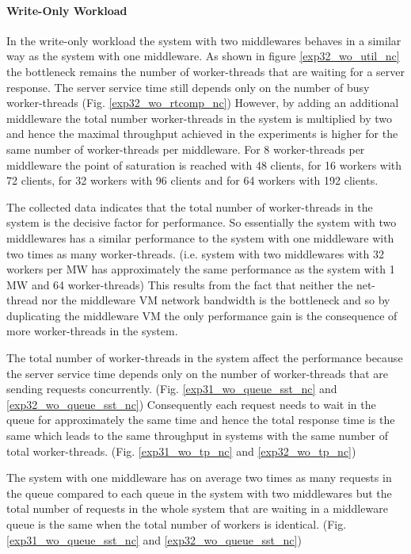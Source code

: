 \documentclass[report.tex]{subfiles}
\begin{document}
\paragraph{Write-Only Workload}

In the write-only workload the system with two middlewares behaves in a similar way as the system with one middleware. 
As shown in figure \ref{exp32_wo_util_nc} the bottleneck remains the number of worker-threads that are waiting for a server response. The server service time still depends only on the number of busy worker-threads (Fig. \ref{exp32_wo_rtcomp_nc})
However, by adding an additional middleware the total number worker-threads in the system is multiplied by two and hence the maximal throughput achieved in the experiments is higher for the same number of worker-threads per middleware.
For 8 worker-threads per middleware the point of saturation is reached with 48 clients, for 16 workers with 72 clients, for 32 workers with 96 clients and for 64 workers with 192 clients.


The collected data indicates that the total number of worker-threads in the system is the decisive factor for performance.
So essentially the system with two middlewares has a similar performance to the system with one middleware with two times as many worker-threads. (i.e. system with two middlewares with 32 workers per MW has approximately the same performance as the system with 1 MW and 64 worker-threads)
This results from the fact that neither the net-thread nor the middleware VM network bandwidth is the bottleneck and so by duplicating the middleware VM the only performance gain is the consequence of more worker-threads in the system.


The total number of worker-threads in the system affect the performance because the server service time depends only on the number of worker-threads that are sending requests concurrently. (Fig. \ref{exp31_wo_queue_sst_nc} and \ref{exp32_wo_queue_sst_nc})
Consequently each request needs to wait in the queue for approximately the same time and hence the total response time is the same which leads to the same throughput in systems with the same number of total worker-threads. (Fig. \ref{exp31_wo_tp_nc} and \ref{exp32_wo_tp_nc})

The system with one middleware has on average two times as many requests in the queue compared to each queue in the system with two middlewares but the total number of requests in the whole system that are waiting in a middleware queue is the same when the total number of workers is identical. (Fig. \ref{exp31_wo_queue_sst_nc} and \ref{exp32_wo_queue_sst_nc})
\end{document}

